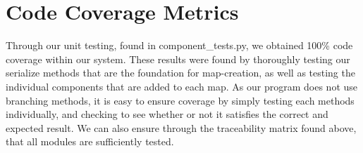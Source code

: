 \documentclass[12pt, titlepage]{article}
\begin{document}
\newpage

\section{Code Coverage Metrics}
Through our unit testing, found in component\_tests.py, we obtained 100\% code coverage within our system. These results were found by thoroughly testing our serialize methods that are the foundation for map-creation, as well as testing the individual components that are added to each map. As our program does not use branching methods, it is easy to ensure coverage by simply testing each methods individually, and checking to see whether or not it satisfies the correct and expected result. We can also ensure through the traceability matrix found above, that all modules are sufficiently tested.




\end{document}
